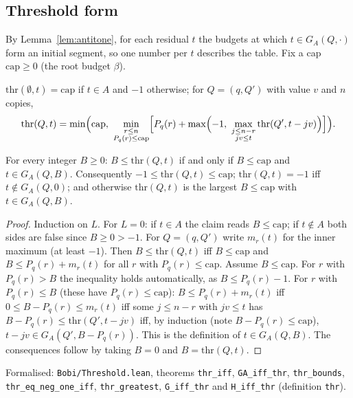 \subsection{Threshold form}

By Lemma~\ref{lem:antitone}, for each residual $t$ the budgets at which
$t\in G_A(Q,\cdot)$ form an initial segment, so one number per $t$ describes
the table. Fix a cap $\mathrm{cap}\ge 0$ (the root budget $\beta$).

\begin{definition}[Threshold]\label{def:thr}
$\mathrm{thr}(\emptyset,t)=\mathrm{cap}$ if $t\in A$ and $-1$ otherwise; for
$Q=(q,Q')$ with value $v$ and $n$ copies,
\[
  \mathrm{thr}(Q,t)=\min\Bigl(\mathrm{cap},\ \min_{\substack{r\le n\\ P_q(r)\le\mathrm{cap}}}
  \Bigl[P_q(r)+\max\Bigl(-1,\ \max_{\substack{j\le n-r\\ jv\le t}}\mathrm{thr}(Q',t-jv)\Bigr)\Bigr]\Bigr).
\]
\end{definition}

\begin{theorem}\label{thm:thr}
For every integer $B\ge 0$: $B\le\mathrm{thr}(Q,t)$ if and only if $B\le\mathrm{cap}$
and $t\in G_A(Q,B)$. Consequently $-1\le\mathrm{thr}(Q,t)\le\mathrm{cap}$;
$\mathrm{thr}(Q,t)=-1$ iff $t\notin G_A(Q,0)$; and otherwise $\mathrm{thr}(Q,t)$ is the
largest $B\le\mathrm{cap}$ with $t\in G_A(Q,B)$.
\end{theorem}
\begin{proof}
Induction on $L$. For $L=0$: if $t\in A$ the claim reads $B\le\mathrm{cap}$; if
$t\notin A$ both sides are false since $B\ge 0>-1$. For $Q=(q,Q')$ write
$m_r(t)$ for the inner maximum (at least $-1$). Then $B\le\mathrm{thr}(Q,t)$ iff
$B\le\mathrm{cap}$ and $B\le P_q(r)+m_r(t)$ for all $r$ with $P_q(r)\le\mathrm{cap}$.
Assume $B\le\mathrm{cap}$. For $r$ with $P_q(r)>B$ the inequality holds
automatically, as $B\le P_q(r)-1$. For $r$ with $P_q(r)\le B$ (these have
$P_q(r)\le\mathrm{cap}$): $B\le P_q(r)+m_r(t)$ iff $0\le B-P_q(r)\le m_r(t)$ iff some
$j\le n-r$ with $jv\le t$ has $B-P_q(r)\le\mathrm{thr}(Q',t-jv)$ iff, by induction
(note $B-P_q(r)\le\mathrm{cap}$), $t-jv\in G_A(Q',B-P_q(r))$. This is the
definition of $t\in G_A(Q,B)$. The consequences follow by taking $B=0$ and
$B=\mathrm{thr}(Q,t)$.
\end{proof}
{\raggedright\noindent Formalised: \texttt{Bobi/Threshold.lean}, theorems
\texttt{thr\_iff}, \texttt{GA\_iff\_thr}, \texttt{thr\_bounds},
\texttt{thr\_eq\_neg\_one\_iff}, \texttt{thr\_greatest}, \texttt{G\_iff\_thr}
and \texttt{H\_iff\_thr} (definition \texttt{thr}).\par}

